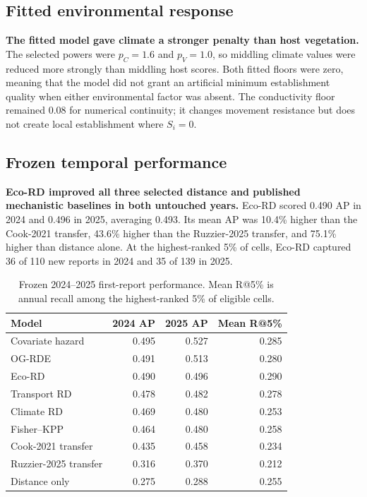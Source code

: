 \documentclass{article}
\begin{document}
\subsection{Fitted environmental response}

\textbf{The fitted model gave climate a stronger penalty than host vegetation.} The selected powers were $p_C=1.6$ and $p_V=1.0$, so middling climate values were reduced more strongly than middling host scores. Both fitted floors were zero, meaning that the model did not grant an artificial minimum establishment quality when either environmental factor was absent. The conductivity floor remained 0.08 for numerical continuity; it changes movement resistance but does not create local establishment where $S_i=0$.

\subsection{Frozen temporal performance}

\textbf{Eco-RD improved all three selected distance and published mechanistic baselines in both untouched years.} Eco-RD scored 0.490 AP in 2024 and 0.496 in 2025, averaging 0.493. Its mean AP was 10.4\% higher than the Cook-2021 transfer, 43.6\% higher than the Ruzzier-2025 transfer, and 75.1\% higher than distance alone. At the highest-ranked 5\% of cells, Eco-RD captured 36 of 110 new reports in 2024 and 35 of 139 in 2025.

\begin{table}[H]
\centering
\caption{Frozen 2024--2025 first-report performance. Mean R@5\% is annual recall among the highest-ranked 5\% of eligible cells.}
\label{tab:results}
\begin{tabular}{@{}lrrr@{}}
\toprule
Model & 2024 AP & 2025 AP & Mean R@5\% \\
\midrule
Covariate hazard & 0.495 & 0.527 & 0.285 \\
OG-RDE & 0.491 & 0.513 & 0.280 \\
Eco-RD & 0.490 & 0.496 & 0.290 \\
Transport RD & 0.478 & 0.482 & 0.278 \\
Climate RD & 0.469 & 0.480 & 0.253 \\
Fisher--KPP & 0.464 & 0.480 & 0.258 \\
Cook-2021 transfer & 0.435 & 0.458 & 0.234 \\
Ruzzier-2025 transfer & 0.316 & 0.370 & 0.212 \\
Distance only & 0.275 & 0.288 & 0.255 \\
\bottomrule
\end{tabular}
\end{table}
\end{document}
